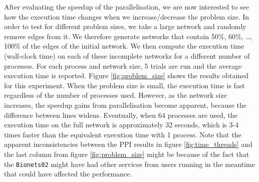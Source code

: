 After evaluating the speedup of the parallelisation, we are now interested to see how the execution time changes when we increase/decrease the problem size. In order to test for different problem sizes, we take a large network and randomly remove edges from it. We therefore generate networks that contain 50\%, 60\%, \dots , 100\% of the edges of the initial network. We then compute the execution time (wall-clock time) on each of these incomplete networks for a different number of processes. For each process and network size, 5 trials are run and the average execution time is reported. Figure \ref{fig:problem_size} shows the results obtained for this experiment. When the problem size is small, the execution time is fast regardless of the number of processes used. However, as the network size increases, the speedup gains from parallelisation become apparent, because the difference between lines widens. Eventually, when 64 processes are used, the execution time on the full network is approximately 32 seconds, 
which is 3-4 times faster than the equivalent execution time with 1 process. Note that the apparent inconsistencies between the PPI results in figure \ref{fig:time_threads} and the last column from figure \ref{fig:problem_size} might be because of the fact that the \lstinline|Bionets02| might have had other services from users running in the meantime that could have affected the performance.


